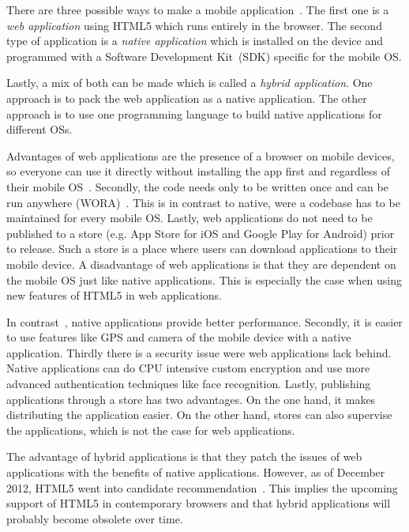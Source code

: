 \documentclass[a4paper]{artikel3}
\begin{document}
There are three possible ways to make a mobile application~\cite{Accenture2012,Hales2012}.
The first one is a \emph{web application} using HTML5 which runs entirely in the browser.
The second type of application is a \emph{native application} which is installed on the device and programmed with a Software Development Kit~(SDK) specific for the mobile OS.

Lastly, a mix of both can be made which is called a \emph{hybrid application}.
One approach is to pack the web application as a native application.
The other approach is to use one programming language to build native applications for different OSs.

Advantages of web applications are the presence of a browser on mobile devices, so everyone can use it directly without installing the app first and regardless of their mobile OS~\cite{Accenture2012}.
Secondly, the code needs only to be written once and can be run anywhere (WORA)~\cite{Hales2012}.
This is in contrast to native, were a codebase has to be maintained for every mobile OS.
Lastly, web applications do not need to be published to a store (e.g. App Store for iOS and Google Play for Android) prior to release.
Such a store is a place where users can download applications to their mobile device.
A disadvantage of web applications is that they are dependent on the mobile OS just like native applications.
This is especially the case when using new features of HTML5 in web applications.

In contrast~\cite{Accenture2012}, native applications provide better performance.
Secondly, it is easier to use features like GPS and camera of the mobile device with a native application.
Thirdly there is a security issue were web applications lack behind. 
Native applications can do CPU intensive custom encryption and use more advanced authentication techniques like face recognition.
Lastly, publishing applications through a store has two advantages.
On the one hand, it makes distributing the application easier.
On the other hand, stores can also supervise the applications, which is not the case for web applications.

The advantage of hybrid applications is that they patch the issues of web applications with the benefits of native applications.
However, as of December 2012, HTML5 went into candidate recommendation~\cite{Jacobs2012}.
This implies the upcoming support of HTML5 in contemporary browsers and that hybrid applications will probably become obsolete over time.

\end{document}
